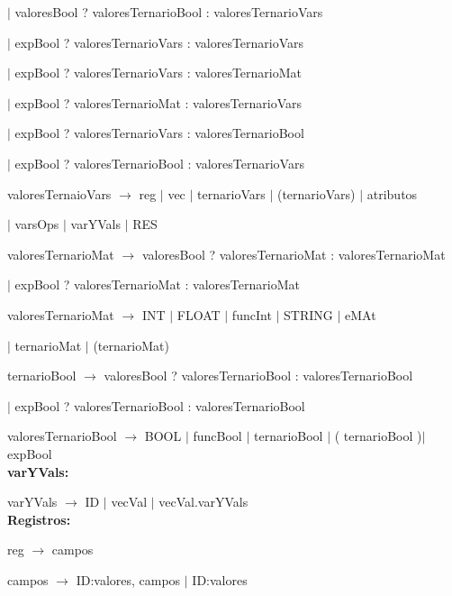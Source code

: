   \hspace{15mm}$|$  valoresBool ? valoresTernarioBool : valoresTernarioVars
  
  \hspace{15mm}$|$  expBool ? valoresTernarioVars : valoresTernarioVars
  
  \hspace{15mm}$|$  expBool ? valoresTernarioVars : valoresTernarioMat 
  
  \hspace{15mm}$|$  expBool ? valoresTernarioMat : valoresTernarioVars
  
  \hspace{15mm}$|$  expBool ? valoresTernarioVars : valoresTernarioBool 
  
  \hspace{15mm}$|$  expBool ? valoresTernarioBool : valoresTernarioVars  
  

  
valoresTernaioVars $\rightarrow$ reg $|$ vec $|$ ternarioVars $|$ (ternarioVars) $|$ atributos 

\hspace{15mm}$|$ varsOps  $|$ varYVals $|$ RES

valoresTernarioMat $\rightarrow$ valoresBool ? valoresTernarioMat : valoresTernarioMat  

\hspace{15mm}$|$ expBool ? valoresTernarioMat : valoresTernarioMat
  
valoresTernarioMat $\rightarrow$ INT $|$ FLOAT $|$ funcInt $|$ STRING $|$ eMAt 

\hspace{15mm}$|$ ternarioMat $|$ (ternarioMat)

ternarioBool $\rightarrow$ valoresBool ? valoresTernarioBool : valoresTernarioBool  

\hspace{15mm}$|$ expBool ? valoresTernarioBool : valoresTernarioBool
  
valoresTernarioBool $\rightarrow$ BOOL $|$ funcBool $|$ ternarioBool $|$ ( ternarioBool )$|$ expBool \\
   

\textbf{varYVals:}

varYVals $\rightarrow$ ID $|$ vecVal $|$ vecVal.varYVals \\


\textbf{Registros:} 

reg $\rightarrow$ {campos}

campos $\rightarrow$ ID:valores, campos $|$ ID:valores \\


